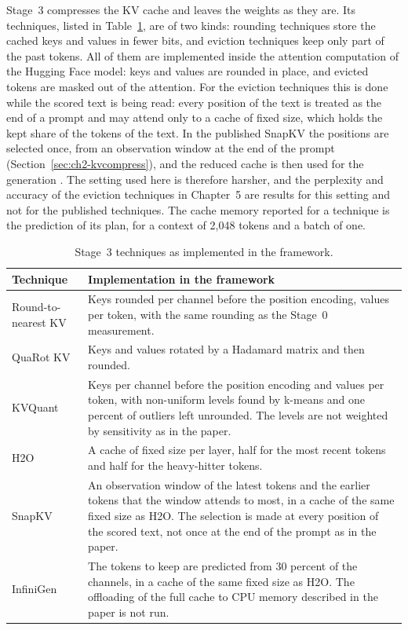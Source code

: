 \documentclass[
11pt, %
english, %
singlespacing, %
headsepline, %
]{MastersDoctoralThesis} %
\begin{document}
Stage~3 compresses the KV cache and leaves the weights as they are. Its techniques, listed in Table~\ref{tab:ch4-stage3}, are of two kinds: rounding techniques store the cached keys and values in fewer bits, and eviction techniques keep only part of the past tokens. All of them are implemented inside the attention computation of the Hugging Face model: keys and values are rounded in place, and evicted tokens are masked out of the attention. For the eviction techniques this is done while the scored text is being read: every position of the text is treated as the end of a prompt and may attend only to a cache of fixed size, which holds the kept share of the tokens of the text. In the published SnapKV the positions are selected once, from an observation window at the end of the prompt (Section~\ref{sec:ch2-kvcompress}), and the reduced cache is then used for the generation \cite{li2024snapkv}. The setting used here is therefore harsher, and the perplexity and accuracy of the eviction techniques in Chapter~5 are results for this setting and not for the published techniques. The cache memory reported for a technique is the prediction of its plan, for a context of 2{,}048 tokens and a batch of one.

\begin{table}[htbp]
\centering
\small
\caption{Stage~3 techniques as implemented in the framework.}
\label{tab:ch4-stage3}
\renewcommand{\arraystretch}{1.2}
\begin{tabularx}{\textwidth}{lX}
\hline
\textbf{Technique} & \textbf{Implementation in the framework} \\
\hline
Round-to-nearest KV & Keys rounded per channel before the position encoding, values per token, with the same rounding as the Stage~0 measurement. \\
QuaRot KV \cite{ashkboos2024quarot} & Keys and values rotated by a Hadamard matrix and then rounded. \\
KVQuant \cite{hooper2024kvquant} & Keys per channel before the position encoding and values per token, with non-uniform levels found by k-means and one percent of outliers left unrounded. The levels are not weighted by sensitivity as in the paper. \\
H2O \cite{zhang2023h2o} & A cache of fixed size per layer, half for the most recent tokens and half for the heavy-hitter tokens. \\
SnapKV \cite{li2024snapkv} & An observation window of the latest tokens and the earlier tokens that the window attends to most, in a cache of the same fixed size as H2O. The selection is made at every position of the scored text, not once at the end of the prompt as in the paper. \\
InfiniGen \cite{lee2024infinigen} & The tokens to keep are predicted from 30 percent of the channels, in a cache of the same fixed size as H2O. The offloading of the full cache to CPU memory described in the paper is not run. \\
\hline
\end{tabularx}
\end{table}
\end{document}

